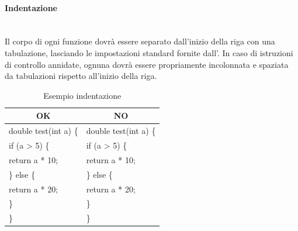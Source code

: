 \paragraph{Indentazione}\mbox{}\\[0.4cm]
Il corpo di ogni funzione dovrà essere separato dall’inizio della riga con una tabulazione, lasciando le impostazioni standard fornite dall’. In caso di istruzioni di controllo annidate, ognuna dovrà essere propriamente incolonnata e spaziata da tabulazioni rispetto all'inizio della riga.
\begin{table} [H]
	\begin{center}
		\begin{tabular}{ | l | l |}
			\multicolumn{1}{c}{\textbf{OK}}&\multicolumn{1}{c}{\textbf{NO}}\\ 
			\hline
			double test(int a) \{ & double test(int a) \{\\
			\hspace{0.5cm}if (a > 5) \{ 			   &  if (a > 5) \{\\
			\hspace{1cm}return a * 10;          & \hspace{0.5cm}return a * 10;\\
		    \hspace{0.5cm}\} else \{ 					& \} else \{\\
			\hspace{1cm}return a * 20;          & \hspace{0.5cm}return a * 20;\\
			\hspace{0.5cm}\}								& \}\\
			\}								& \}\\
			\hline
		\end{tabular}
	\end{center}
\caption{Esempio indentazione}
\end{table}

